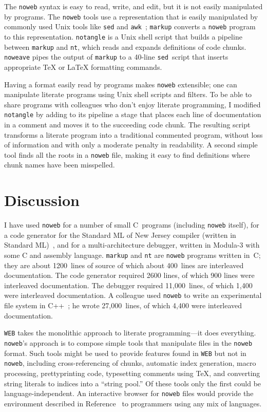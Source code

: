 The \verb+noweb+ syntax is easy to read, write, and edit, but it is
not easily manipulated by programs.
The \verb+noweb+ tools use a representation that is easily manipulated
by commonly used Unix tools like {\tt sed} and {\tt awk}~\cite{kernighan:unix};
 \verb+markup+ converts a \verb+noweb+ program
to this representation.
\verb+notangle+ is a Unix shell script that builds a
pipeline between \verb+markup+ and \verb+nt+, which reads
and expands definitions of code chunks.
\verb+noweave+ pipes the output of \verb+markup+ to a 40-line
\verb+sed+~script that inserts appropriate {\TeX} or {\LaTeX} formatting commands.

Having a format easily read by programs makes {\tt noweb} extensible;
one can manipulate literate programs using Unix shell scripts and
filters.
To be able to share programs with colleagues who don't enjoy literate
programming, I modified \verb+notangle+ by adding to its pipeline a
stage that
places each line of documentation in a comment and moves it to
the succeeding code chunk.  The resulting script transforms a literate
program into a traditional commented program, without loss of
information and with only a moderate penalty in readability.
A second simple tool finds all the roots in a {\tt noweb} file, making
it easy to find definitions where chunk names have been misspelled.

\section{Discussion}

I have used \verb+noweb+ for a number of small C~programs (including
\verb+noweb+ itself), for a code generator for 
the Standard ML of New Jersey compiler (written in Standard
ML)~\cite{appel:smlnj}, and 
for a multi-architecture debugger, written in Modula-3 with some C and
assembly language.
\verb+markup+ and \verb+nt+ are \verb+noweb+ programs written in~C;
they are about 1200~lines of source of which about 400~lines are
interleaved documentation.
The code generator required 2600 lines, of which 900 lines were
interleaved documentation.
The debugger required 11,000~lines, of which 1,400 were interleaved
documentation.
A colleague used \verb+noweb+ to write an experimental file
system in C++~\cite{staelin:high}; he wrote 27,000~lines, of which
4,400 were interleaved documentation. 

{\tt WEB} takes the monolithic approach to literate programming---it
does everything.
{\tt noweb}'s approach is to compose
simple tools that manipulate files in the {\tt noweb} format. 
Such tools might be used to provide features found in {\tt WEB} but
not in {\tt noweb}, including cross-referencing of chunks, automatic
index generation, macro processing, prettyprinting code, typesetting
comments using {\TeX}, and converting string literals to indices into a
``string pool.''
Of these tools only the first could be language-independent.
An interactive browser for {\tt noweb} files would provide the
environment described in Reference~ to
programmers using any mix of languages.

